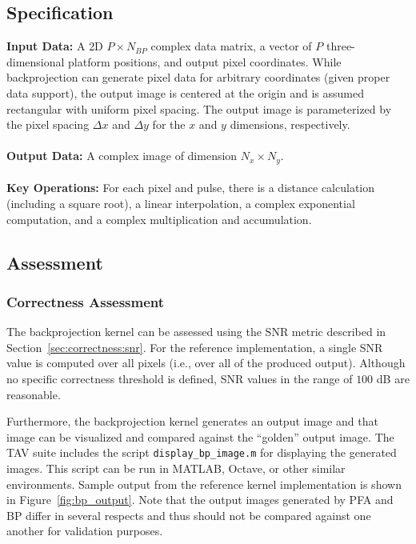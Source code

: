 \documentclass{report}
\begin{document}
\subsection{Specification}

\textbf{Input Data:} A {2D} $P \times N_{BP}$ complex data matrix, a 
vector of $P$ three-dimensional platform positions, and output pixel coordinates.
While backprojection can generate pixel data for arbitrary coordinates (given proper
data support), the output image is centered at the origin and is assumed rectangular
with uniform pixel spacing.
The output image is parameterized by the pixel spacing $\Delta x$ and
$\Delta y$ for the $x$ and $y$ dimensions, respectively. \\ \\
\textbf{Output Data:} 
A complex image of dimension $N_x \times N_y$. \\ \\
\textbf{Key Operations:} For each pixel and pulse, there is a distance calculation
(including a square root), a linear interpolation, a complex exponential computation,
and a complex multiplication and accumulation.

\subsection{Assessment}

\subsubsection{Correctness Assessment}

The backprojection kernel can be assessed using the SNR metric described
in Section~\ref{sec:correctness:snr}.
For the reference implementation, a single SNR value is computed over all
pixels (i.e., over all of the produced output).
Although no specific correctness threshold is defined, SNR values in the
range of $100$ dB are reasonable.

Furthermore, the backprojection kernel generates an output image and that
image can be visualized and compared against the ``golden'' output image.
The TAV suite includes the script \texttt{display\_bp\_image.m} 
for displaying the generated images.
This script can be run in MATLAB, Octave, or other similar environments.
Sample output from the reference kernel implementation is shown in
Figure~\ref{fig:bp_output}.
Note that the output images generated by PFA and BP differ in several
respects and thus should not be compared against one another for
validation purposes.
\end{document}
